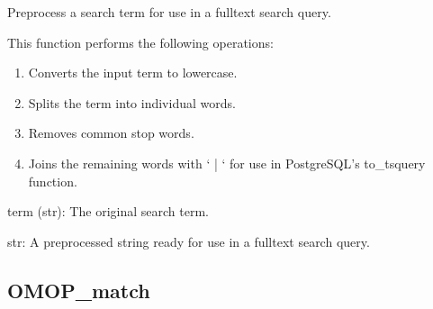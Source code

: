 \documentclass[letterpaper,10pt,english]{sphinxmanual}
\begin{document}
\begin{fulllineitems}
\label{\detokenize{autoapi/preprocess/index:preprocess.preprocess_search_term}}
\pysigstartsignatures
{}
\pysigstopsignatures
\sphinxAtStartPar
Preprocess a search term for use in a full\sphinxhyphen{}text search query.

\sphinxAtStartPar
This function performs the following operations:
\begin{enumerate}
%
\item {} 
\sphinxAtStartPar
Converts the input term to lowercase.

\item {} 
\sphinxAtStartPar
Splits the term into individual words.

\item {} 
\sphinxAtStartPar
Removes common stop words.

\item {} 
\sphinxAtStartPar
Joins the remaining words with ‘ | ‘ for use in PostgreSQL’s to\_tsquery function.

\end{enumerate}
\begin{description}
\sphinxAtStartPar
term (str): The original search term.

\sphinxAtStartPar
str: A preprocessed string ready for use in a full\sphinxhyphen{}text search query.

\begin{sphinxVerbatim}[commandchars=\\\{\}]
\end{sphinxVerbatim}

\end{description}

\end{fulllineitems}


\sphinxstepscope


\subsection{OMOP\_match}
\label{\detokenize{autoapi/OMOP_match/index:module-OMOP_match}}\label{\detokenize{autoapi/OMOP_match/index:omop-match}}\label{\detokenize{autoapi/OMOP_match/index::doc}}
\end{document}
